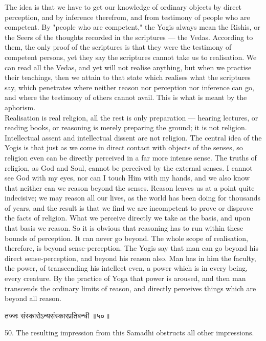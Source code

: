 The idea is that we have to get our knowledge of ordinary
objects by direct perception, and by inference therefrom, and from
testimony of people who are competent. By "people who are competent,"
the Yogis always mean the Rishis, or the Seers of the thoughts recorded
in the scriptures — the Vedas. According to them, the only proof of the
scriptures is that they were the testimony of competent persons, yet
they say the scriptures cannot take us to realisation. We can read all
the Vedas, and yet will not realise anything, but when we practise
their teachings, then we attain to that state which realises what the
scriptures say, which penetrates where neither reason nor perception
nor inference can go, and where the testimony of others cannot avail.
This is what is meant by the aphorism. \\

Realisation is real religion, all the rest is only preparation
— hearing lectures, or reading books, or reasoning is merely preparing
the ground; it is not religion. Intellectual assent and intellectual
dissent are not religion. The central idea of the Yogis is that just as
we come in direct contact with objects of the senses, so religion even
can be directly perceived in a far more intense sense. The truths of
religion, as God and Soul, cannot be perceived by the external senses.
I cannot see God with my eyes, nor can I touch Him with my hands, and
we also know that neither can we reason beyond the senses. Reason
leaves us at a point quite indecisive; we may reason all our lives, as
the world has been doing for thousands of years, and the result is that
we find we are incompetent to prove or disprove the facts of religion.
What we perceive directly we take as the basis, and upon that basis we
reason. So it is obvious that reasoning has to run within these bounds
of perception. It can never go beyond. The whole scope of realisation,
therefore, is beyond sense-perception. The Yogis say that man can go
beyond his direct sense-perception, and beyond his reason also. Man has
in him the faculty, the power,
of transcending his intellect even, a power which is in every being,
every creature. By the practice of Yoga that power is aroused, and then
man transcends the ordinary limits of reason, and directly perceives
things which are beyond all reason. \\

\begin{center}
\begin{sanskrit}
तज्जः संस्कारोऽन्यसंस्कारप्रतिबन्धी ॥५०॥
\end{sanskrit}
\end{center}
50. The resulting impression from this Samadhi obstructs all
other impressions. \\

